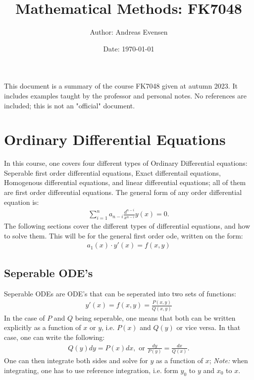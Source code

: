\documentclass[12pt]{article}
\title{Mathematical Methods: FK7048}
\author{Author: Andreas Evensen}
\date{Date: \today}
\begin{document}
\maketitle
\begin{figure}[H]
    \centering
\end{figure}
\newpage
\tableofcontents
\vspace*{2cm}
\begin{center}
This document is a summary of the course FK7048 given at autumn 2023. It includes examples taught by the professor and personal notes. No references are included; this is not an "official" document.
\end{center}
\newpage

\section{Ordinary Differential Equations}
In this course, one covers four different types of Ordinary Differential equations: Seperable first order differential equations, Exact differentail equations, Homogenous differential equations, and linear differential equations; all of them are first order differential equations. The general form of any order differential equation is:
\begin{align*}
    \sum_{i = 1}^n a_{n-i}\frac{d^{n-i}}{x^{n - i}}y(x) = 0.
\end{align*}
\noindent
The following sections cover the different types of differential equations, and how to solve them. This will be for the general first order ode, written on the form:
\begin{align}
    a_1(x)\cdot y'(x) = f(x,y)\label{eq: first order general case}
\end{align}

\subsection{Seperable ODE's}
Seperable ODEs are ODE's that can be seperated into two sets of functions:
\begin{align*}
    y'(x) = f(x,y) = \frac{P(x,y)}{Q(x,y)}
\end{align*}In the case of $P$ and $Q$ being seperable, one means that both can be written explicitly as a function of $x$ or $y$, i.e. $P(x)$ and $Q(y)$ or vice versa.
In that case, one can write the following:
\begin{align*}
    Q(y)dy = P(x)dx, \text{ or } \frac{dy}{P(y)} = \frac{dx}{Q(x)}.
\end{align*}One can then integrate both sides and solve for $y$ as a function of $x$; \textit{Note:} when integrating, one has to use reference integration, i.e. form $y_0$ to $y$ and $x_0$ to $x$.
\end{document}
